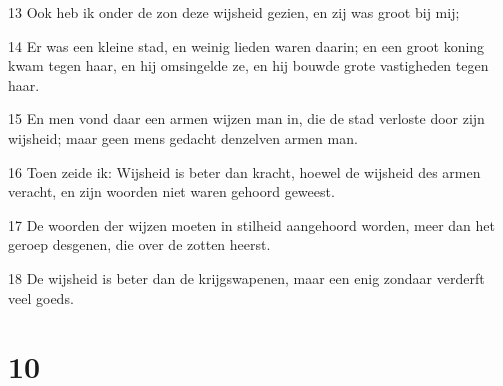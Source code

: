 \par 13 Ook heb ik onder de zon deze wijsheid gezien, en zij was groot bij mij;
\par 14 Er was een kleine stad, en weinig lieden waren daarin; en een groot koning kwam tegen haar, en hij omsingelde ze, en hij bouwde grote vastigheden tegen haar.
\par 15 En men vond daar een armen wijzen man in, die de stad verloste door zijn wijsheid; maar geen mens gedacht denzelven armen man.
\par 16 Toen zeide ik: Wijsheid is beter dan kracht, hoewel de wijsheid des armen veracht, en zijn woorden niet waren gehoord geweest.
\par 17 De woorden der wijzen moeten in stilheid aangehoord worden, meer dan het geroep desgenen, die over de zotten heerst.
\par 18 De wijsheid is beter dan de krijgswapenen, maar een enig zondaar verderft veel goeds.

\chapter{10}

